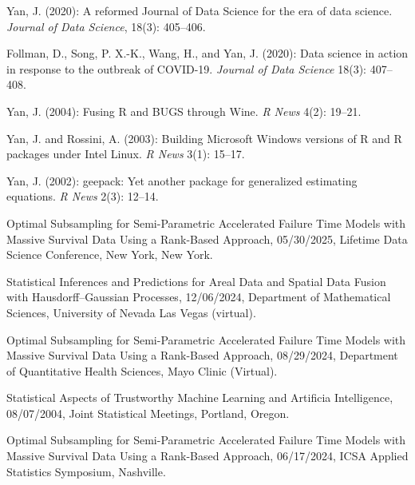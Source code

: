 \documentclass[Statistics]{vita}
\begin{document}
\begin{vita}
\begin{Publications}
\begin{OtherPublications}
  \item Yan, J. (2020): A reformed Journal of Data Science for the era of data science. {\em Journal of Data Science\/}, 18(3): 405--406.
  \item Follman, D., Song, P. X.-K., Wang, H., and Yan, J. (2020): Data science in action in response to the outbreak of COVID-19. {\em Journal of Data Science\/} 18(3): 407--408.
  \item Yan, J. (2004): Fusing {R} and {BUGS} through {Wine}. {\em R News\/} 4(2): 19--21.
  \item Yan, J. and Rossini, A. (2003): Building {M}icrosoft {W}indows versions of {R} and {R} packages under {I}ntel {L}inux. {\em R News\/} 3(1): 15--17.
  \item Yan, J. (2002): geepack: Yet another package for generalized estimating equations. {\em R News\/} 2(3): 12--14.
  \end{OtherPublications}
  \end{Publications}
  \begin{InvitedTalksLectures}
  \begin{InvitedTalks}
  \item Optimal Subsampling for Semi-Parametric Accelerated Failure Time Models with Massive Survival Data Using a Rank-Based Approach, 05/30/2025, Lifetime Data Science Conference, New York, New York.
  \item Statistical Inferences and Predictions for Areal Data and Spatial Data Fusion with Hausdorff--Gaussian Processes, 12/06/2024, Department of Mathematical Sciences, University of Nevada Las Vegas (virtual).
  \item Optimal Subsampling for Semi-Parametric Accelerated Failure Time Models with Massive Survival Data Using a Rank-Based Approach, 08/29/2024, Department of Quantitative Health Sciences, Mayo Clinic (Virtual).
  \item Statistical Aspects of Trustworthy Machine Learning and Artificia Intelligence, 08/07/2004, Joint Statistical Meetings, Portland, Oregon.
  \item Optimal Subsampling for Semi-Parametric Accelerated Failure Time Models with Massive Survival Data Using a Rank-Based Approach, 06/17/2024, ICSA Applied Statistics Symposium, Nashville.

\end{InvitedTalks}
\end{InvitedTalksLectures}
\end{vita}
\end{document}
